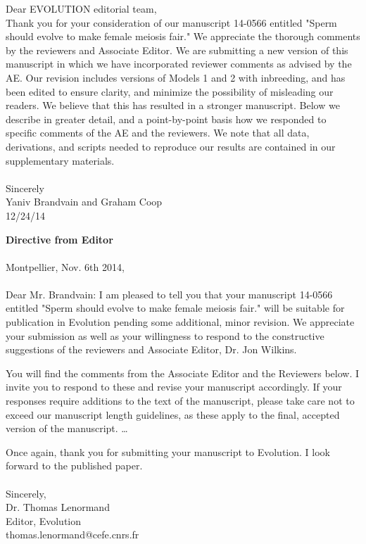 \documentclass[12pt,letterpaper]{article}
\begin{document}
Dear EVOLUTION editorial team,
\\

Thank you for your consideration of our manuscript 14-0566 entitled "Sperm should evolve to make female meiosis fair." We appreciate the thorough comments by the reviewers and Associate Editor. We are submitting a new version of this manuscript in which we have incorporated reviewer comments as advised by the AE. Our revision includes versions of Models 1 and 2 with inbreeding, and has been edited to ensure clarity, and minimize the possibility of misleading our readers. We believe that this has resulted in a stronger manuscript. Below we describe in greater detail, and a point-by-point basis how we responded to specific comments of the AE and the reviewers. We note that all data, derivations, and scripts needed to reproduce our results are contained in our supplementary materials. 
\\
\\
Sincerely \\
Yaniv Brandvain and Graham Coop\\
12/24/14
\newpage


{\bf{Directive from Editor}} \\ \\
Montpellier, Nov. 6th 2014,
\\ \\
Dear Mr. Brandvain: 
I am pleased to tell you that your manuscript 14-0566 entitled "Sperm should evolve to make female meiosis fair." will be suitable for publication in Evolution pending some additional, minor revision. We appreciate your submission as well as your willingness to respond to the constructive suggestions of the reviewers and Associate Editor, Dr. Jon Wilkins.

You will find the comments from the Associate Editor and the Reviewers below. I invite you to respond to these and revise your manuscript accordingly. If your responses require additions to the text of the manuscript, please take care not to exceed our manuscript length guidelines, as these apply to the final, accepted version of the manuscript. \dots{}

Once again, thank you for submitting your manuscript to Evolution.  I look forward to the published paper.
\\  \\
Sincerely, \\
Dr. Thomas Lenormand \\
Editor, Evolution \\
thomas.lenormand@cefe.cnrs.fr
\end{document}
